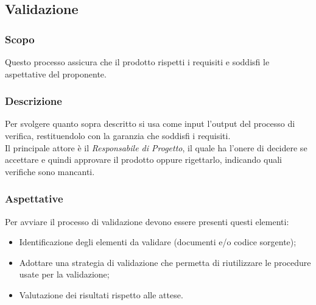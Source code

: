 

\subsection{Validazione}
\label{_validazione}
\subsubsection{Scopo}
Questo processo assicura che il prodotto rispetti i requisiti e soddisfi le aspettative del proponente.

\subsubsection{Descrizione}
Per svolgere quanto sopra descritto si  usa come input l'output del processo di verifica,
restituendolo con la garanzia che soddisfi i requisiti.\\
Il principale attore è il \textit{Responsabile di Progetto}, il quale ha l'onere di decidere
se accettare e quindi approvare il prodotto oppure rigettarlo, indicando quali verifiche sono mancanti.

\subsubsection{Aspettative}
Per avviare il processo di validazione devono essere presenti questi elementi:
\begin{itemize}
    \item Identificazione degli elementi da validare (documenti e/o codice sorgente);
    \item Adottare una strategia di validazione che permetta di riutilizzare le procedure usate
          per la validazione;
    \item Valutazione dei risultati rispetto alle attese.
\end{itemize}

